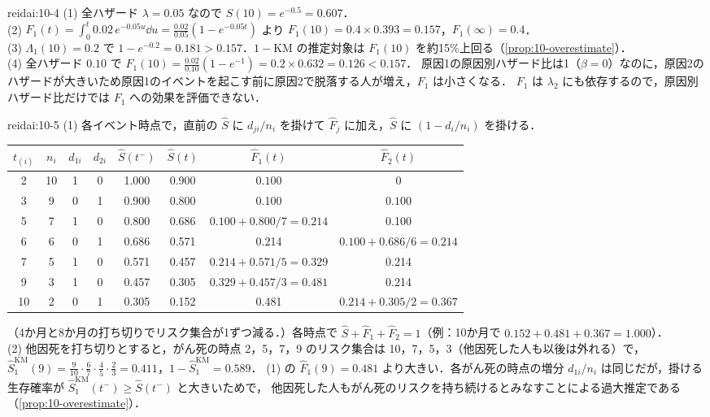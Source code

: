 \begin{kaitou}{reidai:10-4}
(1) 全ハザード $\lambda=0.05$ なので $S(10)=e^{-0.5}=0.607$．\\
(2) $F_1(t)=\int_0^t0.02\,e^{-0.05u}\dd u=\frac{0.02}{0.05}(1-e^{-0.05t})$ より $F_1(10)=0.4\times0.393=0.157$，$F_1(\infty)=0.4$．\\
(3) $\Lambda_1(10)=0.2$ で $1-e^{-0.2}=0.181>0.157$．$1-\mathrm{KM}$ の推定対象は $F_1(10)$ を約15\%上回る（\cref{prop:10-overestimate}）．\\
(4) 全ハザード $0.10$ で $F_1(10)=\frac{0.02}{0.10}(1-e^{-1})=0.2\times0.632=0.126<0.157$．
原因1の原因別ハザード比は1（$\beta=0$）なのに，原因2のハザードが大きいため原因1のイベントを起こす前に原因2で脱落する人が増え，$F_1$ は小さくなる．
$F_1$ は $\lambda_2$ にも依存するので，原因別ハザード比だけでは $F_1$ への効果を評価できない．
\end{kaitou}

\begin{kaitou}{reidai:10-5}
(1) 各イベント時点で，直前の $\hat S$ に $d_{ji}/n_i$ を掛けて $\hat F_j$ に加え，$\hat S$ に $(1-d_i/n_i)$ を掛ける．
\begin{center}\small
\begin{tabular}{@{}cccccccc@{}}
\toprule
$t_{(i)}$ & $n_i$ & $d_{1i}$ & $d_{2i}$ & $\hat S(t^-)$ & $\hat S(t)$ & $\hat F_1(t)$ & $\hat F_2(t)$\\
\midrule
2 & 10 & 1 & 0 & 1.000 & 0.900 & $0.100$ & 0\\
3 & 9 & 0 & 1 & 0.900 & 0.800 & 0.100 & $0.100$\\
5 & 7 & 1 & 0 & 0.800 & 0.686 & $0.100+0.800/7=0.214$ & 0.100\\
6 & 6 & 0 & 1 & 0.686 & 0.571 & 0.214 & $0.100+0.686/6=0.214$\\
7 & 5 & 1 & 0 & 0.571 & 0.457 & $0.214+0.571/5=0.329$ & 0.214\\
9 & 3 & 1 & 0 & 0.457 & 0.305 & $0.329+0.457/3=0.481$ & 0.214\\
10 & 2 & 0 & 1 & 0.305 & 0.152 & 0.481 & $0.214+0.305/2=0.367$\\
\bottomrule
\end{tabular}
\end{center}
（4か月と8か月の打ち切りでリスク集合が1ずつ減る．）各時点で $\hat S+\hat F_1+\hat F_2=1$（例：10か月で $0.152+0.481+0.367=1.000$）．\\
(2) 他因死を打ち切りとすると，がん死の時点 2，5，7，9 のリスク集合は 10，7，5，3（他因死した人も以後は外れる）で，
$\hat S_1^{\mathrm{KM}}(9)=\frac9{10}\cdot\frac67\cdot\frac45\cdot\frac23=0.411$，$1-\hat S_1^{\mathrm{KM}}=0.589$．
(1) の $\hat F_1(9)=0.481$ より大きい．各がん死の時点の増分 $d_{1i}/n_i$ は同じだが，掛ける生存確率が $\hat S_1^{\mathrm{KM}}(t^-)\ge\hat S(t^-)$ と大きいためで，
他因死した人もがん死のリスクを持ち続けるとみなすことによる過大推定である（\cref{prop:10-overestimate}）．
\end{kaitou}

